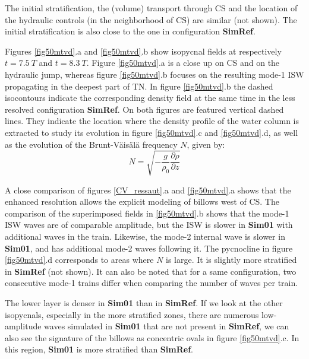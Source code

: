 \documentclass[a4paper,12pt]{article}
\begin{document}
The initial stratification, the (volume) transport through CS and the location of the hydraulic controls (in the neighborhood of CS) are similar (not shown). The initial stratification is also close to the one in configuration \textbf{SimRef}.

Figures \ref{fig50mtvd}.a and \ref{fig50mtvd}.b show isopycnal fields at respectively $t = 7.5\ T$ and $t = 8.3\ T$. Figure \ref{fig50mtvd}.a is a close up on CS and on the hydraulic jump, whereas figure \ref{fig50mtvd}.b focuses on the resulting mode-1 ISW propagating in the deepest part of TN. In figure \ref{fig50mtvd}.b the dashed isocontours indicate the corresponding density field at the same time in the less resolved configuration \textbf{SimRef}. On both figures are featured vertical dashed lines. They indicate the location where the density profile of the water column is extracted to study its evolution in figure \ref{fig50mtvd}.c and \ref{fig50mtvd}.d, as well as the evolution of the Brunt-Väisälä frequency $N$,  given by:
\begin{equation}
N=\sqrt{ - \frac{g}{\rho_0} \frac{\partial \rho}{\partial z}}
\label{eqN}
\end{equation}


A close comparison of figures \ref{CV_ressaut}.a and \ref{fig50mtvd}.a shows that the enhanced resolution allows the explicit modeling of billows west of CS. The comparison of the superimposed fields in \ref{fig50mtvd}.b shows that the mode-1 ISW waves are of comparable amplitude, but the ISW is slower in \textbf{Sim01} with additional waves in the train. Likewise, the mode-2 internal wave is slower in \textbf{Sim01}, and has additional mode-2 waves following it. The pycnocline in figure \ref{fig50mtvd}.d %
corresponds to areas where $N$ is large. It is slightly more stratified in \textbf{SimRef} (not shown). It can also be noted that for a same configuration, two consecutive mode-1 trains differ when comparing the number of waves per train.

The lower layer is denser in \textbf{Sim01} than in \textbf{SimRef}. If we look at the other isopycnals, especially in the more stratified zones, there are numerous low-amplitude waves simulated in \textbf{Sim01} that are not present in \textbf{SimRef}, we can also see the signature of the billows as concentric ovals in figure \ref{fig50mtvd}.c. In this region, \textbf{Sim01} is more stratified than \textbf{SimRef}.
\end{document}
